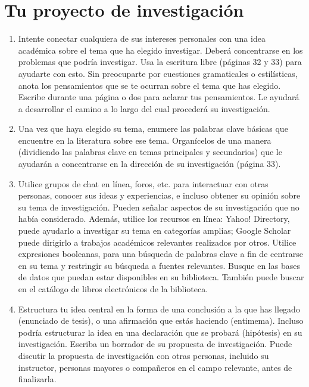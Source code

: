 \section{Tu proyecto de investigación}
\begin{enumerate}[1.]
    \item Intente conectar cualquiera de sus intereses personales con una idea académica sobre el tema que ha elegido investigar. Deberá concentrarse en los problemas que podría investigar. Usa la escritura libre (páginas 32 y 33) para ayudarte con esto. Sin preocuparte por cuestiones gramaticales o estilísticas, anota los pensamientos que se te ocurran sobre el tema que has elegido. Escribe durante una página o dos para aclarar tus pensamientos. Le ayudará a desarrollar el camino a lo largo del cual procederá su investigación. 
    \item Una vez que haya elegido su tema, enumere las palabras clave básicas que encuentre en la literatura sobre ese tema. Organícelos de una manera (dividiendo las palabras clave en temas principales y secundarios) que le ayudarán a concentrarse en la dirección de su investigación (página 33). 
    \item Utilice grupos de chat en línea, foros, etc. para interactuar con otras personas, conocer sus ideas y experiencias, e incluso obtener su opinión sobre su tema de investigación. Pueden señalar aspectos de su investigación que no había considerado. Además, utilice los recursos en línea: Yahoo! Directory, puede ayudarlo a investigar su tema en categorías amplias; Google Scholar puede dirigirlo a trabajos académicos relevantes realizados por otros. Utilice expresiones booleanas, para una búsqueda de palabras clave a fin de centrarse en su tema y restringir su búsqueda a fuentes relevantes. Busque en las bases de datos que puedan estar disponibles en su biblioteca. También puede buscar en el catálogo de libros electrónicos de la biblioteca. 
    \item Estructura tu idea central en la forma de una conclusión a la que has llegado (enunciado de tesis), o una afirmación que estás haciendo (entimema). Incluso podría estructurar la idea en una declaración que se probará (hipótesis) en su investigación. Escriba un borrador de su propuesta de investigación. Puede discutir la propuesta de investigación con otras personas, incluido su instructor, personas mayores o compañeros en el campo relevante, antes de finalizarla.
\end{enumerate}


